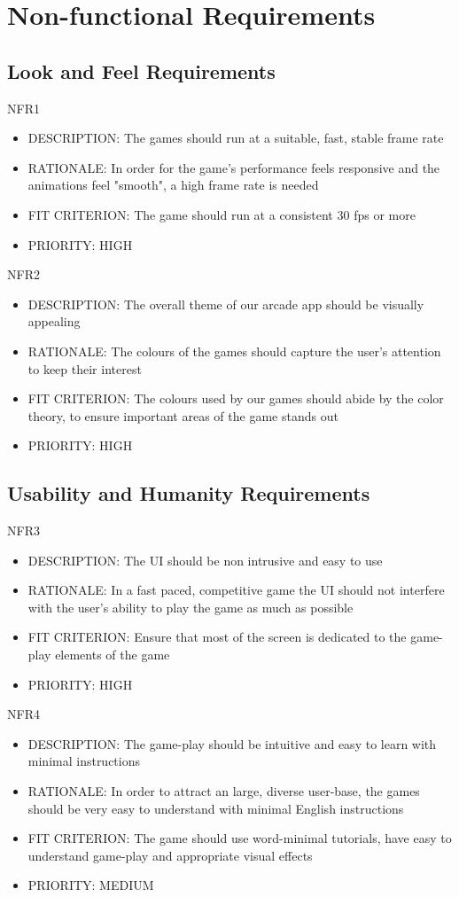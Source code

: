 \documentclass[12pt, titlepage]{article}
\begin{document}
\section{Non-functional Requirements}
\subsection{Look and Feel Requirements}
NFR1
\begin{itemize}
    \item DESCRIPTION: The games should run at a suitable, fast, stable frame rate 
    \item RATIONALE: In order for the game's performance feels responsive and the animations feel "smooth", a high frame rate is needed
    \item FIT CRITERION: The game should run at a consistent 30 fps or more
    \item PRIORITY: HIGH
\end{itemize}

NFR2 
\begin{itemize}
    \item DESCRIPTION: The overall theme of our arcade app should be visually appealing
    \item RATIONALE: The colours of the games should capture the user's attention to keep their interest 
    \item FIT CRITERION: The colours used by our games should abide by the color theory, to ensure important areas of the game stands out
    \item PRIORITY: HIGH
\end{itemize}


\subsection{Usability and Humanity Requirements}
NFR3
\begin{itemize}
    \item DESCRIPTION: The UI should be non intrusive and easy to use
    \item RATIONALE: In a fast paced, competitive game the UI should not interfere with the user's 
ability to play the game as much as possible
    \item FIT CRITERION: Ensure that most of the screen is dedicated to the game-play elements
of the game
    \item PRIORITY: HIGH
\end{itemize}

NFR4
\begin{itemize}
    \item DESCRIPTION: The game-play should be intuitive and easy to learn with minimal instructions
    \item RATIONALE: In order to attract an large, diverse user-base, the games should be very
easy to understand with minimal English instructions
    \item FIT CRITERION: The game should use word-minimal tutorials, have easy to understand game-play
and appropriate visual effects
    \item PRIORITY: MEDIUM
\end{itemize}
\end{document}
